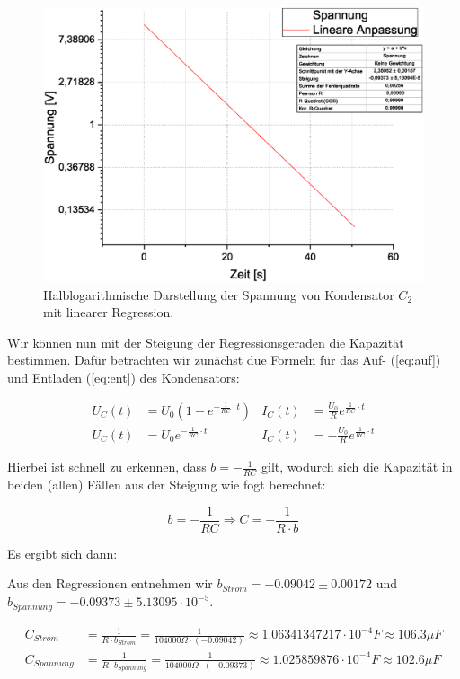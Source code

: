 \documentclass[10pt,a4paper]{article}
\begin{document}
\begin{flushleft}
\begin{figure}[H]
\centering
\includegraphics[scale=0.5]{Graph_Spannung}
\caption{Halblogarithmische Darstellung der Spannung von Kondensator $C_2$ mit linearer Regression.}
\end{figure}

Wir können nun mit der Steigung der Regressionsgeraden die Kapazität bestimmen. Dafür betrachten wir zunächst due Formeln für das Auf- (\ref{eq:auf}) und Entladen (\ref{eq:ent}) des Kondensators:

\begin{align}
U_C(t) &= U_0 \left(1 - e^{- \frac{1}{RC} \cdot t} \right) & I_C(t) &= \frac{U_0}{R} e^{\frac{1}{RC} \cdot t} \label{eq:auf} \\
U_C(t) &= U_0 e^{- \frac{1}{RC} \cdot t} & I_C(t) &= - \frac{U_0}{R} e^{\frac{1}{RC} \cdot t} \label{eq:ent}
\end{align}

Hierbei ist schnell zu erkennen, dass $b = - \frac{1}{RC}$ gilt, wodurch sich die Kapazität in beiden (allen) Fällen aus der Steigung wie fogt berechnet:

\begin{equation*}
b = - \frac{1}{RC} \Rightarrow C = - \frac{1}{R \cdot b}
\end{equation*}

Es ergibt sich dann:

Aus den Regressionen entnehmen wir $b_{Strom} = -0.09042 \pm 0.00172$ und $b_{Spannung} = -0.09373 \pm 5.13095 \cdot 10^{-5}$.

\begin{align*}
C_{Strom} &= \frac{1}{R \cdot b_{Strom}} = \frac{1}{104000 \Omega \cdot (-0.09042)} \approx 1.06341347217 \cdot 10^{-4} F \approx 106.3 \mu F \\
C_{Spannung} &= \frac{1}{R \cdot b_{Spannung}} = \frac{1}{104000 \Omega \cdot (-0.09373)} \approx 1.025859876 \cdot 10^{-4} F \approx 102.6 \mu F
\end{align*}

\end{flushleft}
\end{document}
